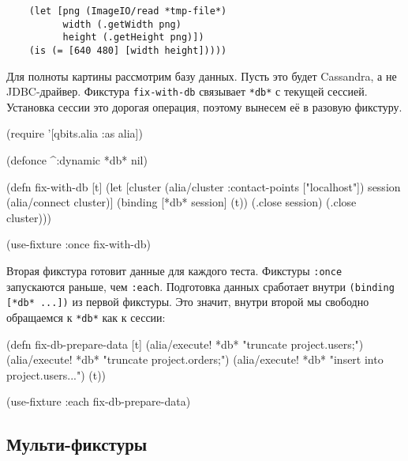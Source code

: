 \begin{english}
  \begin{verbatim}
    (let [png (ImageIO/read *tmp-file*)
          width (.getWidth png)
          height (.getHeight png)])
    (is (= [640 480] [width height]))))
  \end{verbatim}
\end{english}


Для полноты картины рассмотрим базу данных. Пусть это будет Cassandra, а не
JDBC-драйвер. Фикстура \verb|fix-with-db| связывает \verb|*db*| с текущей
сессией. Установка сессии это дорогая операция, поэтому вынесем её в разовую
фикстуру.

\begin{english}
  \begin{clojure}
(require '[qbits.alia :as alia])

(defonce ^:dynamic *db* nil)

(defn fix-with-db [t]
  (let [cluster (alia/cluster {:contact-points ["localhost"]})
        session (alia/connect cluster)]
    (binding [*db* session]
      (t))
    (.close session)
    (.close cluster)))

(use-fixture :once fix-with-db)
  \end{clojure}
\end{english}

Вторая фикстура готовит данные для каждого теста. Фикстуры \verb|:once|
запускаются раньше, чем \verb|:each|. Подготовка данных сработает внутри
\verb|(binding [*db* ...])| из первой фикстуры. Это значит, внутри второй мы
свободно обращаемся к \verb|*db*| как к сессии:


\begin{english}
  \begin{clojure}
(defn fix-db-prepare-data [t]
  (alia/execute! *db* "truncate project.users;")
  (alia/execute! *db* "truncate project.orders;")
  (alia/execute! *db* "insert into project.users...")
  (t))

(use-fixture :each fix-db-prepare-data)
  \end{clojure}
\end{english}

\subsection{Мульти-фикстуры}

